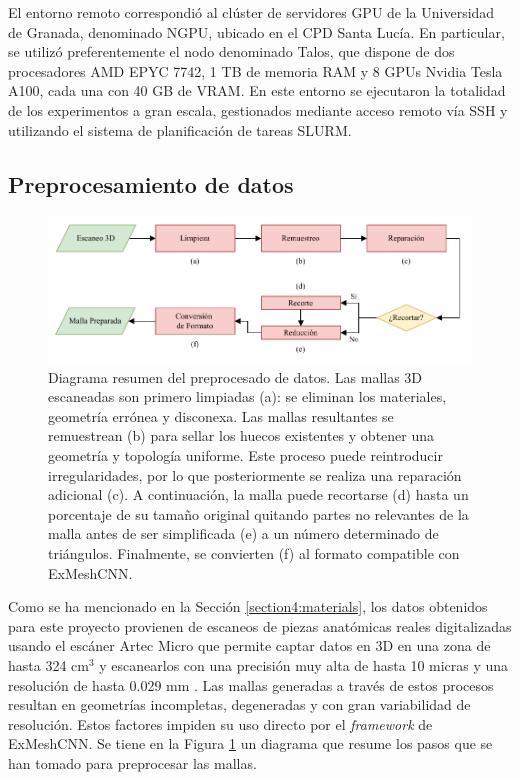 El entorno remoto correspondió al clúster de servidores GPU de la Universidad de Granada, denominado NGPU, ubicado en el CPD Santa Lucía. En particular, se utilizó preferentemente el nodo denominado Talos, que dispone de dos procesadores AMD EPYC 7742, 1 TB de memoria RAM y 8 GPUs Nvidia Tesla A100, cada una con 40 GB de VRAM. En este entorno se ejecutaron la totalidad de los experimentos a gran escala, gestionados mediante acceso remoto vía SSH y utilizando el sistema de planificación de tareas SLURM.

\subsection{Preprocesamiento de datos}

\begin{figure}[h]
    \includegraphics[width=\linewidth]{figures/4_materials-methods/mesh_preparation_pipeline.pdf}
    \caption[Diagrama resumen del preprocesado de datos]{Diagrama resumen del preprocesado de datos. Las mallas 3D escaneadas son primero limpiadas (a): se eliminan los materiales, geometría errónea y disconexa. Las mallas resultantes se remuestrean (b) para sellar los huecos existentes y obtener una geometría y topología uniforme. Este proceso puede reintroducir irregularidades, por lo que posteriormente se realiza una reparación adicional (c). A continuación, la malla puede recortarse (d) hasta un porcentaje de su tamaño original quitando partes no relevantes de la malla antes de ser simplificada (e) a un número determinado de triángulos. Finalmente, se convierten (f) al formato compatible con ExMeshCNN.}
    \label{mesh_preparation_pipeline}
\end{figure}

Como se ha mencionado en la Sección \ref{section4:materials}, los datos obtenidos para este proyecto provienen de escaneos de piezas anatómicas reales digitalizadas usando el escáner Artec Micro que permite captar datos en 3D en una zona de hasta 324 cm$^3$ y escanearlos con una precisión muy alta de hasta 10 micras y una resolución de hasta 0.029 mm \cite{artec_data}. Las mallas generadas a través de estos procesos resultan en geometrías incompletas, degeneradas y con gran variabilidad de resolución. Estos factores impiden su uso directo por el \textit{framework} de ExMeshCNN. Se tiene en la Figura \ref{mesh_preparation_pipeline} un diagrama que resume los pasos que se han tomado para preprocesar las mallas.

